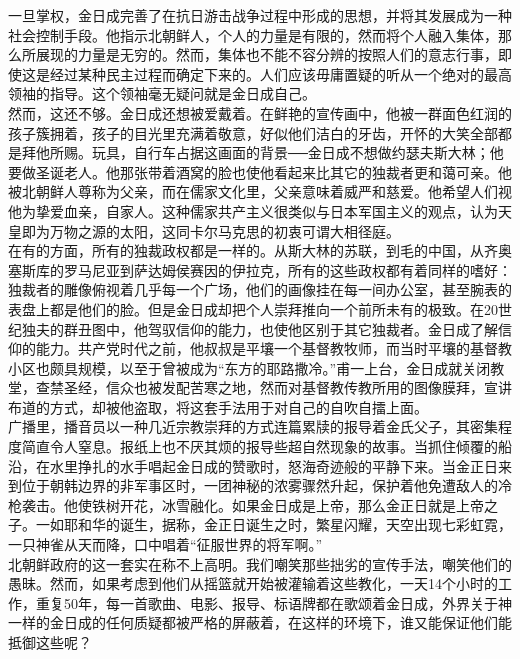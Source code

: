 一旦掌权，金日成完善了在抗日游击战争过程中形成的思想，并将其发展成为一种社会控制手段。他指示北朝鲜人，个人的力量是有限的，然而将个人融入集体，那么所展现的力量是无穷的。然而，集体也不能不容分辨的按照人们的意志行事，即使这是经过某种民主过程而确定下来的。人们应该毋庸置疑的听从一个绝对的最高领袖的指导。这个领袖毫无疑问就是金日成自己。\\

然而，这还不够。金日成还想被爱戴着。在鲜艳的宣传画中，他被一群面色红润的孩子簇拥着，孩子的目光里充满着敬意，好似他们洁白的牙齿，开怀的大笑全部都是拜他所赐。玩具，自行车占据这画面的背景──金日成不想做约瑟夫斯大林；他要做圣诞老人。他那张带着酒窝的脸也使他看起来比其它的独裁者更和蔼可亲。他被北朝鲜人尊称为父亲，而在儒家文化里，父亲意味着威严和慈爱。他希望人们视他为挚爱血亲，自家人。这种儒家共产主义很类似与日本军国主义的观点，认为天皇即为万物之源的太阳，这同卡尔马克思的初衷可谓大相径庭。\\

在有的方面，所有的独裁政权都是一样的。从斯大林的苏联，到毛的中国，从齐奥塞斯库的罗马尼亚到萨达姆侯赛因的伊拉克，所有的这些政权都有着同样的嗜好：独裁者的雕像俯视着几乎每一个广场，他们的画像挂在每一间办公室，甚至腕表的表盘上都是他们的脸。但是金日成却把个人崇拜推向一个前所未有的极致。在20世纪独夫的群丑图中，他驾驭信仰的能力，也使他区别于其它独裁者。金日成了解信仰的能力。共产党时代之前，他叔叔是平壤一个基督教牧师，而当时平壤的基督教小区也颇具规模，以至于曾被成为“东方的耶路撒冷。”甫一上台，金日成就关闭教堂，查禁圣经，信众也被发配苦寒之地，然而对基督教传教所用的图像膜拜，宣讲布道的方式，却被他盗取，将这套手法用于对自己的自吹自擂上面。\\

广播里，播音员以一种几近宗教崇拜的方式连篇累牍的报导着金氏父子，其密集程度简直令人窒息。报纸上也不厌其烦的报导些超自然现象的故事。当抓住倾覆的船沿，在水里挣扎的水手唱起金日成的赞歌时，怒海奇迹般的平静下来。当金正日来到位于朝韩边界的非军事区时，一团神秘的浓雾骤然升起，保护着他免遭敌人的冷枪袭击。他使铁树开花，冰雪融化。如果金日成是上帝，那么金正日就是上帝之子。一如耶和华的诞生，据称，金正日诞生之时，繁星闪耀，天空出现七彩虹霓，一只神雀从天而降，口中唱着“征服世界的将军啊。”\\

北朝鲜政府的这一套实在称不上高明。我们嘲笑那些拙劣的宣传手法，嘲笑他们的愚昧。然而，如果考虑到他们从摇篮就开始被灌输着这些教化，一天14个小时的工作，重复50年，每一首歌曲、电影、报导、标语牌都在歌颂着金日成，外界关于神一样的金日成的任何质疑都被严格的屏蔽着，在这样的环境下，谁又能保证他们能抵御这些呢？\\

